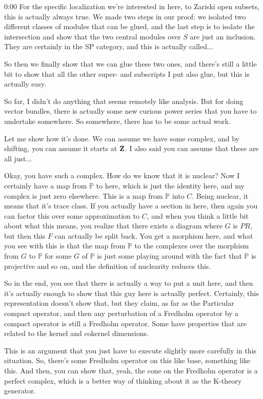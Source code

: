 \begin{unfinished}{0:00}
For the specific localization we're interested in here, to Zariski open subsets, this is actually always true. We made two steps in our proof: we isolated two different classes of modules that can be glued, and the last step is to isolate the intersection and show that the two central modules over $S$ are just an inclusion. They are certainly in the SP category, and this is actually called...

So then we finally show that we can glue these two ones, and there's still a little bit to show that all the other super- and subscripts I put also glue, but this is actually easy.

So far, I didn't do anything that seems remotely like analysis. But for doing vector bundles, there is actually some new curious power series that you have to undertake somewhere. So somewhere, there has to be some actual work.

Let me show how it's done. We can assume we have some complex, and by shifting, you can assume it starts at $\mathbf Z$. I also said you can assume that these are all just...

Okay, you have such a complex. How do we know that it is nuclear? Now I certainly have a map from $\mathbb{P}$ to here, which is just the identity here, and my complex is just zero elsewhere. This is a map from $\mathbb{P}$ into $C$. Being nuclear, it means that it's trace class. If you actually have a section in here, then again you can factor this over some approximation to $C$, and when you think a little bit about what this means, you realize that there exists a diagram where $G$ is $PR$, but then this $F$ can actually be split back. You get a morphism here, and what you see with this is that the map from $\mathbb{P}$ to the complexes over the morphism from $G$ to $\mathbb{P}$ for some $G$ of $\mathbb{P}$ is just some playing around with the fact that $\mathbb{P}$ is projective and so on, and the definition of nuclearity reduces this.

So in the end, you see that there is actually a way to put a unit here, and then it's actually enough to show that this guy here is actually perfect. Certainly, this representation doesn't show that, but they claim, as far as the
Particular compact operator, and then any perturbation of a Fredholm operator by a compact operator is still a Fredholm operator. Some have properties that are related to the kernel and cokernel dimensions.

This is an argument that you just have to execute slightly more carefully in this situation. So, there's some Fredholm operator on this like base, something like this. And then, you can show that, yeah, the cone on the Fredholm operator is a perfect complex, which is a better way of thinking about it as the K-theory generator.


\end{unfinished}

